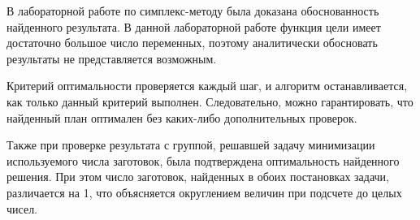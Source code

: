 \documentclass[../body.tex]{subfiles}
\begin{document}
В лабораторной работе по симплекс-методу была доказана обоснованность найденного результата. В данной лабораторной работе функция цели имеет достаточно большое число переменных, поэтому аналитически обосновать результаты не представляется возможным.

Критерий оптимальности проверяется каждый шаг, и алгоритм останавливается, как только
данный критерий выполнен. Следовательно, можно гарантировать, что найденный план оптимален без каких-либо дополнительных проверок.

Также при проверке результата с группой, решавшей задачу минимизации используемого числа заготовок, была подтверждена оптимальность найденного решения. При этом число заготовок, найденных в обоих постановках задачи, различается на 1, что объясняется округлением величин при подсчете до целых чисел.
\end{document}
